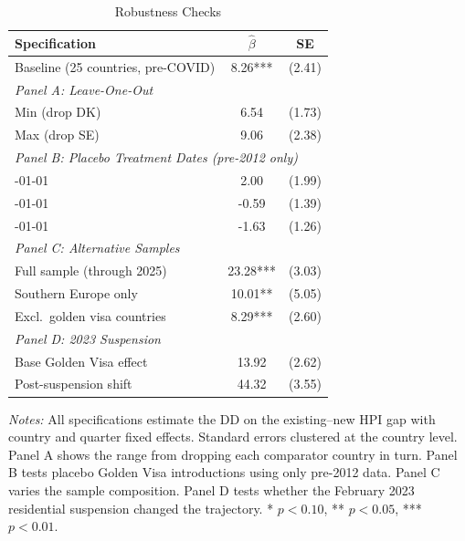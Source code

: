 \begin{table}[H]
\centering
\caption{Robustness Checks}
\label{tab:robustness}
\begin{threeparttable}
\begin{tabular}{lcc}
\toprule
Specification & $\hat{\beta}$ & SE \\
\midrule
Baseline (25 countries, pre-COVID) & 8.26*** & (2.41) \\
\midrule
\multicolumn{3}{l}{\textit{Panel A: Leave-One-Out}} \\
\quad Min (drop DK) & 6.54 & (1.73) \\
\quad Max (drop SE) & 9.06 & (2.38) \\
\midrule
\multicolumn{3}{l}{\textit{Panel B: Placebo Treatment Dates (pre-2012 only)}} \\
\quad 2009-01-01 & 2.00 & (1.99) \\
\quad 2010-01-01 & -0.59 & (1.39) \\
\quad 2011-01-01 & -1.63 & (1.26) \\
\midrule
\multicolumn{3}{l}{\textit{Panel C: Alternative Samples}} \\
\quad Full sample (through 2025) & 23.28*** & (3.03) \\
\quad Southern Europe only & 10.01** & (5.05) \\
\quad Excl.\ golden visa countries & 8.29*** & (2.60) \\
\midrule
\multicolumn{3}{l}{\textit{Panel D: 2023 Suspension}} \\
\quad Base Golden Visa effect & 13.92 & (2.62) \\
\quad Post-suspension shift & 44.32 & (3.55) \\
\bottomrule
\end{tabular}
\begin{tablenotes}[flushleft]
\small
\item \textit{Notes:} All specifications estimate the DD on the existing--new HPI gap with country and quarter fixed effects. Standard errors clustered at the country level. Panel A shows the range from dropping each comparator country in turn. Panel B tests placebo Golden Visa introductions using only pre-2012 data. Panel C varies the sample composition. Panel D tests whether the February 2023 residential suspension changed the trajectory. * $p < 0.10$, ** $p < 0.05$, *** $p < 0.01$.
\end{tablenotes}
\end{threeparttable}
\end{table}


